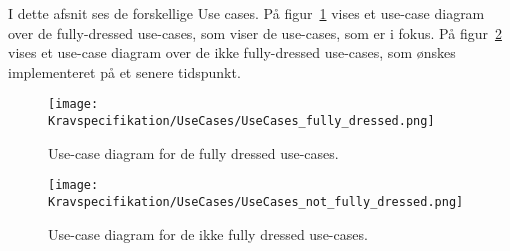 I dette afsnit ses de forskellige Use cases. På figur~\ref{fig:fullydressedusecases} vises et use-case diagram over de fully-dressed use-cases, som viser de use-cases, som er i fokus. På figur~\ref{fig:ikkefullydressedusecases} vises et use-case diagram over de ikke fully-dressed use-cases, som ønskes implementeret på et senere tidspunkt. 
\begin{figure}[ht]
	\centering
	\texttt{[image: Kravspecifikation/UseCases/UseCases\_fully\_dressed.png]}
	\caption{Use-case diagram for de fully dressed use-cases.}
	\label{fig:fullydressedusecases}
\end{figure}

\begin{figure}[ht]
	\centering
	\texttt{[image: Kravspecifikation/UseCases/UseCases\_not\_fully\_dressed.png]}
	\caption{Use-case diagram for de ikke fully dressed use-cases.}
	\label{fig:ikkefullydressedusecases}
\end{figure}
\newpage





